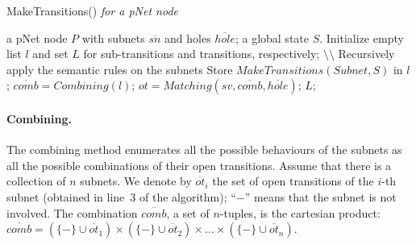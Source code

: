 \documentclass[smallcondensed]{svjour3}
\newcommand{\noteSB}[2][color=green!40, size=\tiny]{\todo[#1]{{\bf
      Note: } {#2}}}
\begin{document}
\begin{algorithm}[h]
\caption{MakeTransitions() \em{for a pNet node}}
  \label{alg2}
\begin{algorithmic}[1]
\Require a pNet node $P$ with subnets $\overline{sn}$ and holes $\overline{hole}$; a global state $S$.
\State Initialize empty list $l$ and set $L$ for sub-transitions and transitions, respectively;
        \hfill $\setminus \setminus$ Recursively apply the semantic rules on the subnets
           \State Store $\mathit{MakeTransitions}(Subnet, S)$ in $l$;
	\EndFor
	\State $\overline{comb} = \mathit{Combining}(l)$;
           \State $ot = \mathit{Matching}(sv, \overline{\mathit{comb}}, \overline{\mathit{hole}})$;
	\EndFor
\State \Return $L$;
\end{algorithmic}  
\end{algorithm}



%
%


\def\inactive{\{-\}}
\paragraph{Combining.}
The combining method enumerates all the possible behaviours of the
subnets as all the possible combinations of their open transitions.
Assume that there is a collection of $n$ subnets.
We denote by $\overline{ot}_i$ the set of open
transitions of the $i$-th
subnet (obtained in line~3 of the algorithm); %
``$-$'' means that the subnet is not involved.
The combination $\overline{comb}$, a set of $n$-tuples, is the
cartesian product:  
$\overline{comb} = (\inactive\cup \overline{ot}_1) \times (\inactive\cup \overline{ot}_2)\times \dots \times (\inactive\cup \overline{ot}_n)$.
\end{document}
